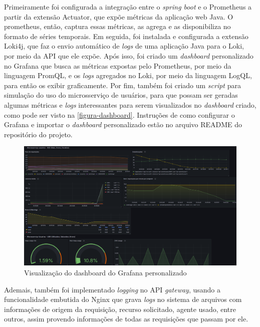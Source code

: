 Primeiramente foi configurada a integração entre o \emph{spring boot} e o Prometheus a partir da extensão Actuator, que expõe métricas da aplicação web Java. O prometheus, então, captura essas métricas, as agrega e as disponibiliza no formato de séries temporais. Em seguida, foi instalada e configurada a extensão Loki4j, que faz o envio automático de \emph{logs} de uma aplicação Java para o Loki, por meio da API que ele expõe. Após isso, foi criado um \emph{dashboard} personalizado no Grafana que busca as métricas expostas pelo Prometheus, por meio da linguagem PromQL, e os \emph{logs} agregados no Loki, por meio da linguagem LogQL, para então os exibir graficamente. Por fim, também foi criado um \emph{script} para simulação do uso do microsserviço de usuários, para que possam ser geradas algumas métricas e \emph{logs} interessantes para serem visualizados no \emph{dashboard} criado, como pode ser visto na \autoref{figura-dashboard}. Instruções de como configurar o Grafana e importar o \emph{dashboard} personalizado estão no arquivo README do repositório do projeto.

\begin{figure}[htb]
	\caption{\label{figura-dashboard}Visualização do dashboard do Grafana personalizado}
	\begin{center}
	    \includegraphics[scale=0.4]{Imagens/dashboard.png}
	\end{center}
\end{figure}

Ademais, também foi implementado \emph{logging} no API \emph{gateway}, usando a funcionalidade embutida do Nginx que grava \emph{logs} no sistema de arquivos com informações de origem da requisição, recurso solicitado, agente usado, entre outros, assim provendo informações de todas as requisições que passam por ele.

